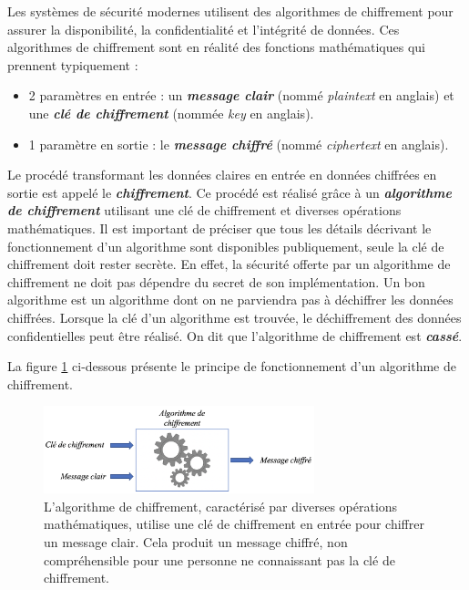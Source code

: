 \documentclass[10pt, oneside, a4paper]{article}
\begin{document}
Les systèmes de sécurité modernes utilisent des algorithmes de chiffrement pour assurer la disponibilité, la confidentialité et l'intégrité de données. Ces algorithmes de chiffrement sont en réalité des fonctions mathématiques qui prennent typiquement : 
\begin{itemize}
\item  2 paramètres en entrée : un \textbf{\textit{message clair}} (nommé \textit{plaintext} en anglais) et une \textbf{\textit{clé de chiffrement}} (nommée \textit{key} en anglais).
\item 1 paramètre en sortie : le \textbf{\textit{message chiffré}} (nommé \textit{ciphertext} en anglais). \\
\end{itemize}
Le procédé transformant les données claires en entrée en données chiffrées en sortie est appelé le \textbf{\textit{chiffrement}}.
Ce procédé est réalisé grâce à un \textbf{\textit{algorithme de chiffrement}} utilisant une clé de chiffrement et diverses opérations mathématiques. Il est important de préciser que tous les détails décrivant le fonctionnement d'un algorithme sont disponibles publiquement, seule la clé de chiffrement doit rester secrète. En effet, la sécurité offerte par un algorithme de chiffrement ne doit pas dépendre du secret de son implémentation. Un bon algorithme est un algorithme dont on ne parviendra pas à déchiffrer les données chiffrées. Lorsque la clé d'un algorithme est trouvée, le déchiffrement des données confidentielles peut être réalisé. On dit que l'algorithme de chiffrement est \textbf{\textit{cassé}}.

La figure \ref{fig:chiffrement} ci-dessous présente le principe de fonctionnement d'un algorithme de chiffrement.

\begin{figure}[htbp]
    \centering
    \includegraphics[width=0.7\textwidth]{image/chiffrement}
    \caption{L'algorithme de chiffrement, caractérisé par diverses opérations mathématiques, utilise une clé de chiffrement en entrée pour chiffrer un message clair. Cela produit un message chiffré, non compréhensible pour une personne ne connaissant pas la clé de chiffrement.}
    \label{fig:chiffrement}
\end{figure}
\end{document}
